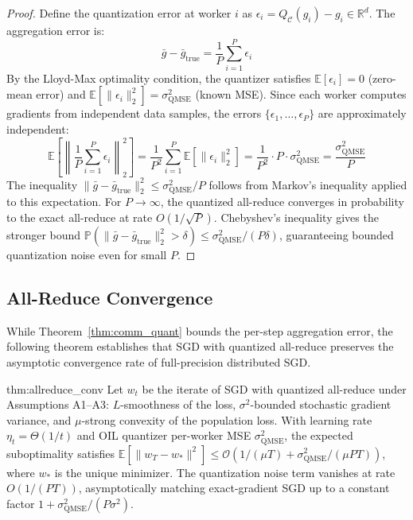 \begin{proof}
Define the quantization error at worker $i$ as $\epsilon_i = Q_{\mathcal{C}}(g_i) - g_i \in \mathbb{R}^d$. The aggregation error is:
\[
\bar{g} - \bar{g}_{\text{true}} = \frac{1}{P} \sum_{i=1}^P \epsilon_i
\]
By the Lloyd-Max optimality condition, the quantizer satisfies $\mathbb{E}[\epsilon_i] = 0$ (zero-mean error) and $\mathbb{E}[\|\epsilon_i\|^2_2] = \sigma^2_{\text{QMSE}}$ (known MSE). Since each worker computes gradients from independent data samples, the errors $\{\epsilon_1, \dots, \epsilon_P\}$ are approximately independent:
\[
\mathbb{E}\left[\left\|\frac{1}{P} \sum_{i=1}^P \epsilon_i\right\|^2_2\right]
= \frac{1}{P^2} \sum_{i=1}^P \mathbb{E}[\|\epsilon_i\|^2_2]
= \frac{1}{P^2} \cdot P \cdot \sigma^2_{\text{QMSE}}
= \frac{\sigma^2_{\text{QMSE}}}{P}
\]
The inequality $\|\bar{g} - \bar{g}_{\text{true}}\|^2_2 \leq \sigma^2_{\text{QMSE}} / P$ follows from Markov's inequality applied to this expectation. For $P \to \infty$, the quantized all-reduce converges in probability to the exact all-reduce at rate $O(1/\sqrt{P})$. Chebyshev's inequality gives the stronger bound $\mathbb{P}(\|\bar{g} - \bar{g}_{\text{true}}\|^2_2 > \delta) \leq \sigma^2_{\text{QMSE}} / (P\delta)$, guaranteeing bounded quantization noise even for small $P$.
\end{proof}

\subsection{All-Reduce Convergence}
\label{sec:allreduce_conv}

While Theorem~\ref{thm:comm_quant} bounds the per-step aggregation error, the following theorem establishes that SGD with quantized all-reduce preserves the asymptotic convergence rate of full-precision distributed SGD.

\begin{mythm}{thm:allreduce_conv}
Let $w_t$ be the iterate of SGD with quantized all-reduce under Assumptions A1--A3: $L$-smoothness of the loss, $\sigma^2$-bounded stochastic gradient variance, and $\mu$-strong convexity of the population loss. With learning rate $\eta_t = \Theta(1/t)$ and OIL quantizer per-worker MSE $\sigma^2_{\text{QMSE}}$, the expected suboptimality satisfies $\mathbb{E}[\|w_T - w_*\|^2] \leq \mathcal{O}(1/(\mu T) + \sigma^2_{\text{QMSE}}/(\mu P T))$, where $w_*$ is the unique minimizer. The quantization noise term vanishes at rate $O(1/(PT))$, asymptotically matching exact-gradient SGD up to a constant factor $1 + \sigma^2_{\text{QMSE}}/(P\sigma^2)$.
\end{mythm}


